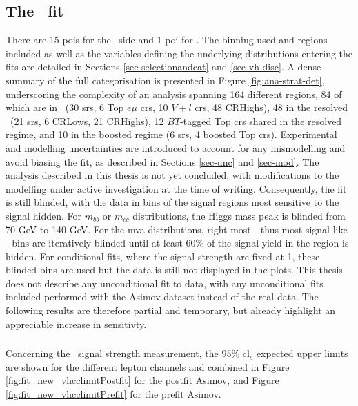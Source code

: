 \subsection[The \vhbc\ Fit]{The \boldvhbc\ fit}\label{subsec-subsecVHBCfit}
There are 15 \glspl{poi} for the \vhb\ side and 1 \gls{poi} for \vhc. The binning used and regions included as well as the variables defining the underlying distributions entering the fits are detailed in Sections \ref{sec-selectionandcat} and \ref{sec-vh-disc}. A dense summary of the full categorisation is presented in Figure \ref{fig:ana-strat-det}, underscoring the complexity of an analysis spanning 164 different regions, 84 of which are in \vhc\ (30 \glspl{sr}, 6 Top $e\mu$ \glspl{cr}, 10 $V+l$ \glspl{cr}, 48 CRHighs), 48 in the resolved \vhb\ (21 \glspl{sr}, 6 CRLows, 21 CRHighs), 12 $BT$-tagged Top \glspl{cr} shared in the resolved regime, and 10 in the boosted regime (6 \glspl{sr}, 4 boosted Top \glspl{cr}). Experimental and modelling uncertainties are introduced to account for any mismodelling and avoid biasing the fit, as described in Sections \ref{sec-unc} and \ref{sec-mod}. The analysis described in this thesis is not yet concluded, with modifications to the modelling under active investigation at the time of writing. Consequently, the fit is still blinded, with the data in bins of the signal regions most sensitive to the signal hidden. For $m_{bb}$ or $m_{cc}$ distributions, the Higgs mass peak is blinded from 70 GeV to 140 GeV. For the \gls{mva} distributions, right-most - thus most signal-like - bins are iteratively blinded until at least 60\% of the signal yield in the region is hidden. For conditional fits, where the signal strength are fixed at 1, these blinded bins are used but the data is still not displayed in the plots. This thesis does not describe any unconditional fit to data, with any unconditional fits included performed with the Asimov dataset instead of the real data. The following results are therefore partial and temporary, but already highlight an appreciable increase in sensitivty. 

\subsubsection{\boldvhc}
Concerning the \vhc\ signal strength measurement, the 95\% \gls{cl}$_s$ expected upper limits are shown for the different lepton channels and combined in Figure \ref{fig:fit_new_vhcclimitPostfit} for the postfit Asimov, and Figure \ref{fig:fit_new_vhcclimitPrefit} for the prefit Asimov. 

